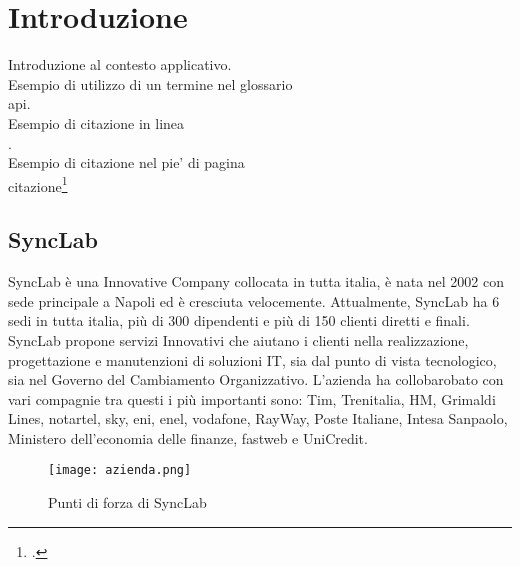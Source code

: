 
\chapter{Introduzione}
\label{cap:introduzione}

Introduzione al contesto applicativo.\\

\noindent Esempio di utilizzo di un termine nel glossario \\
\gls{api}. \\

\noindent Esempio di citazione in linea \\
\cite{site:agile-manifesto}. \\

\noindent Esempio di citazione nel pie' di pagina \\
citazione\footcite{womak:lean-thinking} \\

\section{SyncLab }
SyncLab è una Innovative Company collocata in tutta italia, è nata nel 2002 con sede principale a Napoli ed è cresciuta velocemente. Attualmente, SyncLab ha 6 sedi in tutta italia, più di 300 dipendenti e più di 150 clienti diretti e finali.\\
SyncLab propone servizi Innovativi che aiutano i clienti nella realizzazione, progettazione e manutenzioni di soluzioni IT, sia dal punto di vista tecnologico, sia nel Governo del Cambiamento Organizzativo.
L'azienda ha collobarobato con vari compagnie tra questi i più importanti sono: Tim, Trenitalia, HM, Grimaldi Lines, notartel, sky, eni, enel, vodafone, RayWay, Poste Italiane, Intesa Sanpaolo, Ministero dell'economia delle finanze, fastweb e UniCredit.
\begin{figure}[H]
    \centering
    \texttt{[image: azienda.png]}
    \caption{Punti di forza di SyncLab}
\end{figure}
